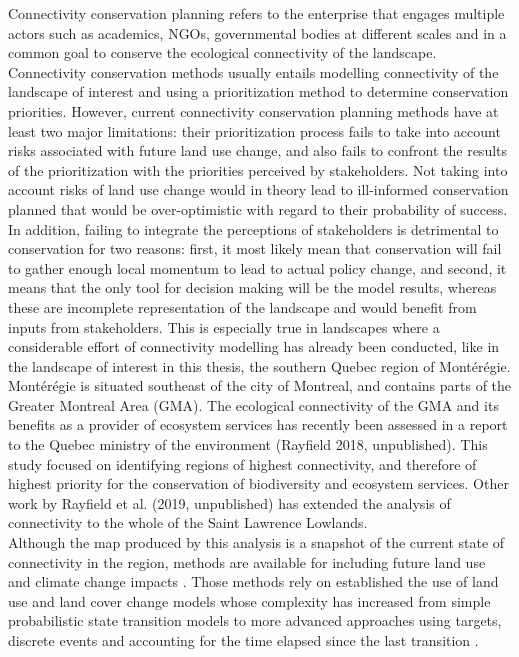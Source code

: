 \documentclass[12pt,Bold,TexShade]{mcgilletdclass}
\begin{document}
{Connectivity conservation planning refers to the enterprise that engages multiple actors such as academics, NGOs, governmental bodies at different scales and in a common goal to conserve the ecological connectivity of the landscape. Connectivity conservation methods usually entails modelling connectivity of the landscape of interest and using a prioritization method to determine conservation priorities. However, current connectivity conservation planning methods have at least two major limitations: their prioritization process fails to take into account risks associated with future land use change, and also fails to confront the results of the prioritization with the priorities perceived by stakeholders. Not taking into account risks of land use change would in theory lead to ill-informed conservation planned that would be over-optimistic with regard to their probability of success. In addition, failing to integrate the perceptions of stakeholders is detrimental to conservation for two reasons: first, it most likely mean that conservation will fail to gather enough local momentum to lead to actual policy change, and second, it means that the only tool for decision making will be the model results, whereas these are incomplete representation of the landscape and would benefit from inputs from stakeholders. This is especially true in landscapes where a considerable effort of connectivity modelling has already been conducted, like in the landscape of interest in this thesis, the southern Quebec region of Montérégie.\\

Montérégie is situated southeast of the city of Montreal, and contains parts of the Greater Montreal Area (GMA). The ecological connectivity of the GMA and its benefits as a provider of ecosystem services has recently been assessed in a report to the Quebec ministry of the environment (Rayfield 2018, unpublished). This study focused on identifying regions of highest connectivity, and therefore of highest priority for the conservation of biodiversity and ecosystem services. Other work by Rayfield et al. (2019, unpublished) has extended the analysis of connectivity to the whole of the Saint Lawrence Lowlands.\\

Although the map produced by this analysis is a snapshot of the current state of connectivity in the region, methods are available for including future land use and climate change impacts \citep{albert_applying_2017}. Those methods rely on established the use of land use and land cover change models whose complexity has increased from simple probabilistic state transition models to more advanced approaches using targets, discrete events and accounting for the time elapsed since the last transition \citep{verburg_combining_2009, daniel_state-and-transition_2016}.\\

}
\end{document}
